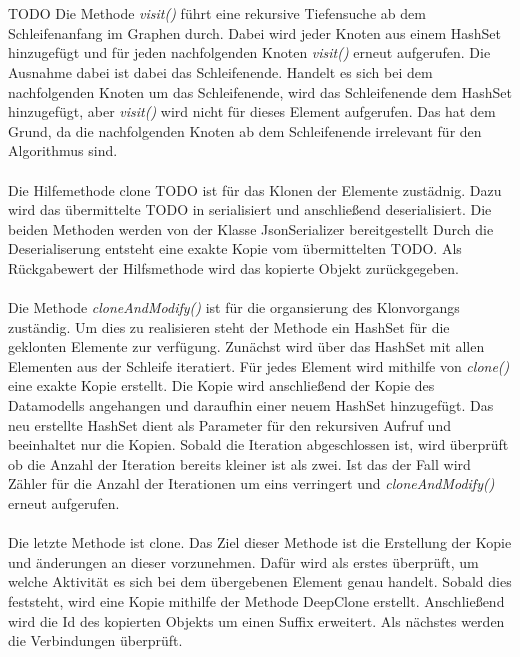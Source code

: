 \documentclass{article}
\begin{document}
    \\
    \\
    TODO
    Die Methode \textit{visit()} führt eine rekursive Tiefensuche ab dem Schleifenanfang im Graphen durch.
    Dabei wird jeder Knoten aus einem HashSet hinzugefügt und für jeden nachfolgenden Knoten \textit{visit()} erneut aufgerufen.
    Die Ausnahme dabei ist dabei das Schleifenende.
    Handelt es sich bei dem nachfolgenden Knoten um das Schleifenende, wird das Schleifenende dem HashSet hinzugefügt, aber \textit{visit()} wird nicht für dieses Element aufgerufen.
    Das hat dem Grund, da die nachfolgenden Knoten ab dem Schleifenende irrelevant für den Algorithmus sind.\\
    \\
    Die Hilfemethode clone TODO ist für das Klonen der Elemente zustädnig. Dazu wird das übermittelte TODO in serialisiert und anschließend deserialisiert.
    Die beiden Methoden werden von der Klasse JsonSerializer bereitgestellt
    Durch die Deserialiserung entsteht eine exakte Kopie vom übermittelten TODO.
    Als Rückgabewert der Hilfsmethode wird das kopierte Objekt zurückgegeben.\\
    \\
    Die Methode \textit{cloneAndModify()} ist für die organsierung des Klonvorgangs zuständig.
    Um dies zu realisieren steht der Methode ein HashSet für die geklonten Elemente zur verfügung.
    Zunächst wird über das HashSet mit allen Elementen aus der Schleife iteratiert.
    Für jedes Element wird mithilfe von \textit{clone()} eine exakte Kopie erstellt.
    Die Kopie wird anschließend der Kopie des Datamodells angehangen und daraufhin einer neuem HashSet hinzugefügt.
    Das neu erstellte HashSet dient als Parameter für den rekursiven Aufruf und beeinhaltet nur die Kopien.
    Sobald die Iteration abgeschlossen ist, wird überprüft ob die Anzahl der Iteration bereits kleiner ist als zwei.
    Ist das der Fall wird Zähler für die Anzahl der Iterationen um eins verringert und \textit{cloneAndModify()} erneut aufgerufen.\\
    \\
    Die letzte Methode ist clone.
    Das Ziel dieser Methode ist die Erstellung der Kopie und änderungen an dieser vorzunehmen.
    Dafür wird als erstes überprüft, um welche Aktivität es sich bei dem übergebenen Element genau handelt.
    Sobald dies feststeht, wird eine Kopie mithilfe der Methode DeepClone erstellt.
    Anschließend wird die Id des kopierten Objekts um einen Suffix erweitert.
    Als nächstes werden die Verbindungen überprüft. 
\end{document}
